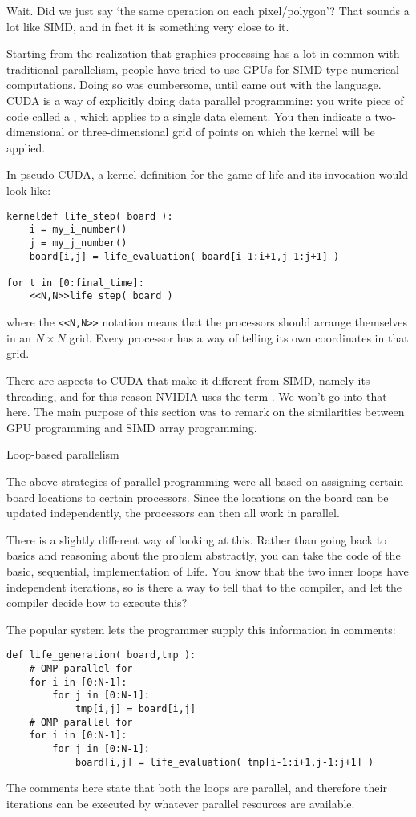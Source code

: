 Wait. Did we just say `the same operation on each pixel/polygon'? That sounds
a lot like \ac{SIMD}, and in fact it is something very close to it.

Starting from the realization that graphics processing has a lot
in common with traditional parallelism, people have tried to use \acp{GPU}
for \ac{SIMD}-type numerical computations. Doing so was cumbersome,
until  came out with the  language.
\ac{CUDA} is a way of explicitly doing data parallel programming:
you write piece of code called a , which 
applies to a single data element. You then indicate a two-dimensional
or three-dimensional grid of points on which the kernel will be applied.

In pseudo-CUDA, a kernel definition for the game of life and its invocation
would look like:
\begin{verbatim}
kerneldef life_step( board ):
    i = my_i_number()
    j = my_j_number()
    board[i,j] = life_evaluation( board[i-1:i+1,j-1:j+1] )

for t in [0:final_time]:
    <<N,N>>life_step( board )
\end{verbatim}
where the \verb+<<N,N>>+ notation means that the processors should arrange
themselves in an $N\times N$ grid. Every processor has a way of telling
its own coordinates in that grid.

There are aspects to CUDA that make it different from SIMD, namely 
its threading, and for this reason NVIDIA uses the term
.  We won't go into that here. The main purpose of this
section was to remark on the similarities between GPU programming
and \ac{SIMD} array programming.

 {Loop-based parallelism}
\label{sec:omp}

The above strategies of parallel programming were all based on
assigning certain board locations to certain processors.
Since the locations on the board can be updated 
independently, the processors can then all work in parallel. 

There is a slightly different way of looking at this.
Rather than going back to basics and reasoning about 
the problem abstractly,
you can take the code of the basic, sequential, implementation of Life.
You know that the two inner loops have independent iterations,
so is there a way to tell that to the compiler, and let the compiler decide
how to execute this?

The popular  system lets the programmer
supply this information in comments:
\begin{verbatim}
def life_generation( board,tmp ):
    # OMP parallel for
    for i in [0:N-1]:
        for j in [0:N-1]:
            tmp[i,j] = board[i,j]
    # OMP parallel for
    for i in [0:N-1]:
        for j in [0:N-1]:
            board[i,j] = life_evaluation( tmp[i-1:i+1,j-1:j+1] )
\end{verbatim}
The comments here state that both
the  loops are parallel, and
therefore their iterations can be executed by whatever parallel resources are
available.

